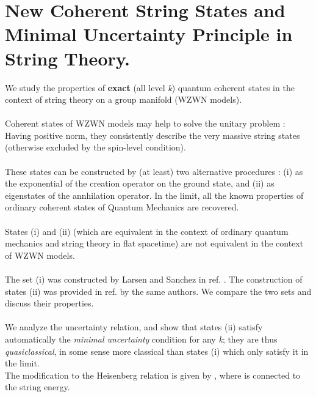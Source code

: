 \documentclass[12pt,a4paper]{article}
\begin{document}
\section{New Coherent String States and Minimal Uncertainty Principle in 
String Theory.}
We study the properties of {\bf exact} (all level {\it k}) quantum coherent 
states in the context of string theory on a group manifold (WZWN models). \\ \\
Coherent states of WZWN models may help to solve the unitary problem : Having 
positive norm, they consistently describe the very massive string states 
(otherwise excluded by the spin-level condition).\\ \\
These states can be constructed by (at least) two alternative procedures : 
(i) as the exponential of the creation operator on the ground state, and (ii) 
as eigenstates of the annhilation operator. In the \coordHE{} 
limit, all the known properties of ordinary coherent states of Quantum 
Mechanics are recovered. \\ \\
States (i) and (ii) (which are equivalent in the context of ordinary quantum 
mechanics and string theory in flat spacetime) are not equivalent in the 
context of WZWN models.\\ \\ The set (i) was constructed by Larsen and Sanchez 
in ref. \cite{ls}. The construction of states (ii) was provided in ref.  
\cite{ls2} by the same authors. We compare the two sets and discuss their 
properties. \\ \\
We analyze the uncertainty relation, and show that states (ii) satisfy 
automatically the {\it minimal uncertainty} condition for any {\it k}; they 
are thus {\it quasiclassical}, in some sense more classical than states (i) 
which 
only satisfy it in the \coordHE{} limit.\\ The modification to the Heisenberg relation is given by \coordHE{}, where \coordHE{} is connected to the string 
energy.
\end{document}
